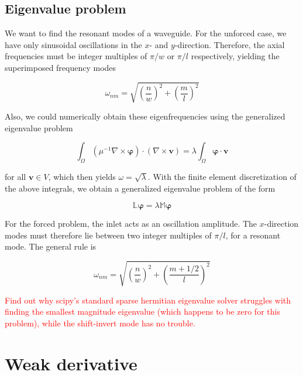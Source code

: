 \documentclass[11pt, a4paper]{article}
\begin{document}
\subsection{Eigenvalue problem}
\label{subsec:evp}

We want to find the resonant modes of a waveguide. For the unforced case,
we have only sinusoidal oscillations in the $x$- and $y$-direction. Therefore,
the axial frequencies must be integer multiples of $\pi/w$ or $\pi/l$ respectively,
yielding the superimposed frequency modes

\begin{equation}
    \omega_{nm} = \sqrt{\left(\frac{n}{w}\right)^2 + \left(\frac{m}{l}\right)^2}
\end{equation}

Also, we could numerically obtain these eigenfrequencies using the generalized
eigenvalue problem

\begin{equation}
    \int_{\Omega} (\mu^{-1} \nabla \times \boldsymbol{\varphi}) \cdot (\nabla \times \mathbf{v})
    = \lambda \int_{\Omega} \boldsymbol{\varphi} \cdot \mathbf{v}
\end{equation}

for all $\mathbf{v} \in V$, which then yields $\omega = \sqrt{\lambda}$.
With the finite element discretization of the above integrals, we obtain a
generalized eigenvalue problem of the form

\begin{equation}
    \mathbb{L} \boldsymbol{\varphi} = \lambda \mathbb{M} \boldsymbol{\varphi}
\end{equation}

For the forced problem, the inlet acts as an oscillation amplitude. The $x$-direction 
modes must therefore lie between two integer multiples of $\pi/l$, for a resonant 
mode. The general rule is 

\begin{equation}
    \omega_{nm} = \sqrt{\left(\frac{n}{w}\right)^2 + \left(\frac{m+1/2}{l}\right)^2}
\end{equation}

\textcolor{red}{Find out why scipy's standard sparse hermitian eigenvalue solver
struggles with finding the smallest magnitude eigenvalue (which happens to be
zero for this problem), while the shift-invert mode has no trouble.}

\section{Weak derivative}
\label{sec:weak}
\end{document}
